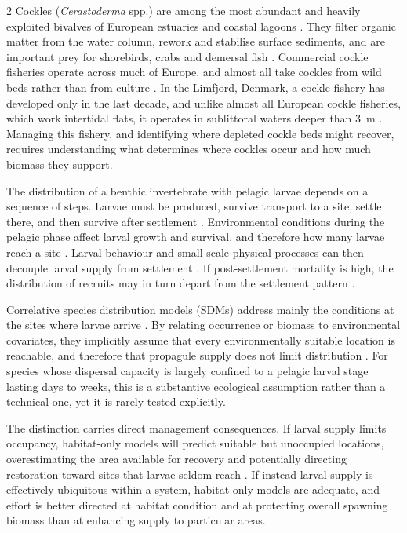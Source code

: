 \begin{spacing}{2}
Cockles (\textit{Cerastoderma} spp.) are among the most abundant and heavily exploited bivalves of European estuaries and coastal lagoons
\citep{malhamReviewBiologyEuropean2012}. They filter organic matter from the water column, rework and stabilise surface sediments, and are important prey for shorebirds, crabs and demersal fish \citep{carssEcosystemServicesProvided2020}. Commercial cockle fisheries operate across much of Europe, and almost all take cockles from wild beds
rather than from culture \citep{carssEcosystemServicesProvided2020}. In the
Limfjord, Denmark, a cockle fishery has developed only in the last decade, and unlike almost all European cockle fisheries, which work intertidal flats, it operates in sublittoral waters deeper than 3~m \citep{Freitas2024}. Managing this fishery, and identifying where depleted cockle beds might recover, requires understanding what determines where cockles occur and how much biomass they support.

The distribution of a benthic invertebrate with pelagic larvae depends on a sequence of steps. Larvae must be produced, survive transport to a site, settle there, and then survive after settlement \citep{pinedaComplexitySimplificationUnderstanding2009}.
Environmental conditions during the pelagic phase affect larval growth and survival, and therefore how many larvae reach a site \citep{cowenLarvalDispersalMarine2009}. Larval behaviour and small-scale physical processes can then decouple larval supply from settlement \citep{pinedaCausesDecouplingLarval2010}. If post-settlement mortality is high, the distribution of recruits may in turn depart from the settlement pattern \citep{gosselinJuvenileMortalityBenthic1997,
huntRoleEarlyPostsettlement1997}. 

Correlative species distribution models (SDMs) address mainly the conditions at the sites where larvae arrive \citep{robinsonPushingLimitsMarine2011}. By relating occurrence or biomass to environmental covariates, they implicitly assume that every environmentally suitable location is reachable, and therefore that propagule supply does not limit distribution \citep{barveCrucialRoleAccessible2011}. For species whose dispersal capacity is largely confined to a pelagic larval stage lasting days to weeks, this is a substantive ecological assumption rather than a technical one, yet it is rarely tested explicitly.

The distinction carries direct management consequences. If larval supply limits occupancy, habitat-only models will predict suitable but unoccupied locations, overestimating the area available for recovery and potentially directing restoration toward sites that larvae seldom reach
\citep{griecoDesigningDispersalConnectivityinformed2026}. If instead larval supply is effectively ubiquitous within a system, habitat-only models are adequate, and effort is better directed at habitat condition and at protecting overall spawning biomass than at enhancing supply to particular areas.


\end{spacing}
